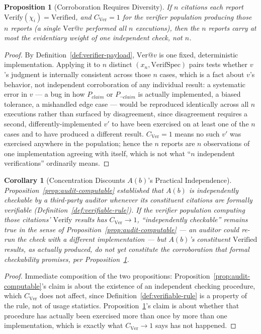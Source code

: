 \documentclass[11pt]{article}
\newtheorem{proposition}[theorem]{Proposition}
\newtheorem{corollary}[theorem]{Corollary}
\theoremstyle{definition}
\begin{document}
\begin{proposition}[Corroboration Requires Diversity]
\label{prop:corroboration-diversity}
If $n$ citations each report $\mathrm{Verify}(\chi_i) = \mathrm{Verified}$, and $C_{\mathrm{Ver}} = 1$ for the verifier population producing those $n$ reports (a single $\mathrm{Ver}@v$ performed all $n$ executions), then the $n$ reports carry at most the evidentiary weight of one independent check, not $n$.
\end{proposition}
\begin{proof}
By Definition~\ref{def:verifier-payload}, $\mathrm{Ver}@v$ is one fixed, deterministic implementation. Applying it to $n$ distinct $(x_n, \mathrm{VerifSpec})$ pairs tests whether $v$'s judgment is internally consistent across those $n$ cases, which is a fact about $v$'s behavior, not independent corroboration of any individual result: a systematic error in $v$ --- a bug in how $P_{\mathit{claim}}$ or $P_{\neg\mathit{claim}}$ is actually implemented, a biased tolerance, a mishandled edge case --- would be reproduced identically across all $n$ executions rather than surfaced by disagreement, since disagreement requires a second, differently-implemented $v'$ to have been exercised on at least one of the $n$ cases and to have produced a different result. $C_{\mathrm{Ver}} = 1$ means no such $v'$ was exercised anywhere in the population; hence the $n$ reports are $n$ observations of one implementation agreeing with itself, which is not what ``$n$ independent verifications'' ordinarily means.
\end{proof}

\begin{corollary}[Concentration Discounts $A(b)$'s Practical Independence]
\label{cor:concentration-discounts-audit}
Proposition~\ref{prop:audit-computable} established that $A(b)$ is independently checkable by a third-party auditor whenever its constituent citations are formally verifiable (Definition~\ref{def:verifiable-rule}). If the verifier population computing those citations' $\mathrm{Verify}$ results has $C_{\mathrm{Ver}} \to 1$, ``independently checkable'' remains true in the sense of Proposition~\ref{prop:audit-computable} --- an auditor \emph{could} re-run the check with a different implementation --- but $A(b)$'s constituent $\mathrm{Verified}$ results, as actually produced, do not yet constitute the corroboration that formal checkability promises, per Proposition~\ref{prop:corroboration-diversity}.
\end{corollary}
\begin{proof}
Immediate composition of the two propositions: Proposition~\ref{prop:audit-computable}'s claim is about the existence of an independent checking procedure, which $C_{\mathrm{Ver}}$ does not affect, since Definition~\ref{def:verifiable-rule} is a property of the rule, not of usage statistics. Proposition~\ref{prop:corroboration-diversity}'s claim is about whether that procedure has actually been exercised more than once by more than one implementation, which is exactly what $C_{\mathrm{Ver}} \to 1$ says has not happened.
\end{proof}
\end{document}
